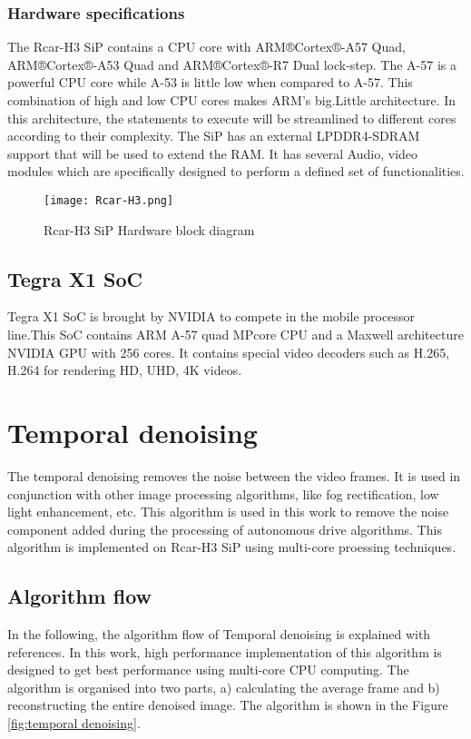 \subsubsection{Hardware specifications} 
The Rcar-H3 SiP contains a CPU core with ARM®Cortex®-A57 Quad, ARM®Cortex®-A53 Quad and ARM®Cortex®-R7 Dual lock-step. The A-57 is a powerful CPU core while A-53 is little low when compared to A-57. This combination of high and low CPU cores makes ARM’s big.Little architecture. In this architecture, the statements to execute will be streamlined to different cores according to their complexity. The SiP has an external LPDDR4-SDRAM support that will be used to extend the RAM. It has several Audio, video modules which are specifically designed to perform a defined set of functionalities.
\begin{figure}[h!]
	\centering
	\texttt{[image: Rcar-H3.png]}
	\caption{Rcar-H3 SiP Hardware block diagram \cite{rcar}}
	\label{fig:Rcar-H3}
\end{figure}
\subsection{Tegra X1 SoC}
Tegra X1 SoC is brought by NVIDIA to compete in the mobile processor line.This SoC contains ARM A-57 quad MPcore  CPU and a Maxwell architecture NVIDIA GPU with 256 cores. It contains special video decoders such as H.265, H.264 for rendering HD, UHD, 4K videos.
\section{Temporal denoising }
The temporal denoising removes the noise between the video frames. It is used in conjunction with other image processing algorithms, like fog rectification, low light enhancement, etc. This algorithm is used in this work to remove the noise component added during the processing of autonomous drive algorithms. This algorithm is implemented on Rcar-H3 SiP using multi-core proessing techniques.
\subsection{Algorithm flow}
In the following, the algorithm flow of Temporal denoising is explained with references. In this work, high performance implementation of this algorithm is designed to get best performance using multi-core CPU computing.
The algorithm is organised into two parts, a) calculating the average frame and b) reconstructing the entire denoised image. The algorithm is shown in the Figure \ref{fig:temporal denoising}. 
